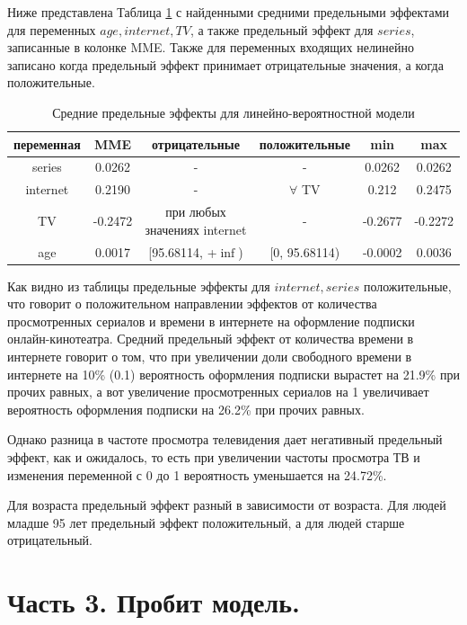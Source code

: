 \documentclass[a4paper,12pt]{article}
\begin{document}
	Ниже представлена Таблица \ref{MElinear} с найденными средними предельными эффектами для переменных  $age, internet, TV$, а также предельный эффект для $series$, записанные в колонке MME. Также для переменных входящих нелинейно записано когда предельный эффект принимает отрицательные значения, а когда положительные.
	
	\begin{table}[h]
		\caption{Средние предельные эффекты для линейно-вероятностной модели}
		\label{MElinear}
		\centering
		\begin{tabular}{|c|c|c|c|c|c|}
			\hline
			переменная &  MME  & отрицательные& положительные&min&max\\ 
			\hline
			series &0.0262 &-&-&0.0262&0.0262\\ 
			\hline
			internet  &0.2190 &-& $\forall$ TV&0.212&0.2475\\ 
			\hline
			TV &-0.2472&при любых значениях internet& - &-0.2677&-0.2272 \\ 			
			\hline
			age  &0.0017 &[95.68114, +$\inf$) &[0, 95.68114)&-0.0002 &0.0036\\ 
			\hline
		\end{tabular}
	\end{table}

	Как видно из таблицы предельные эффекты для $internet, series$ положительные, что говорит о положительном направлении эффектов от количества просмотренных сериалов и времени в интернете на оформление подписки онлайн-кинотеатра. Средний предельный эффект от количества времени в интернете говорит о том, что при увеличении доли свободного времени в интернете на 10\% (0.1) вероятность оформления подписки вырастет на 21.9\% при прочих равных, а вот увеличение просмотренных сериалов на 1 увеличивает вероятность оформления подписки на 26.2\% при прочих равных. 
	
	Однако разница в частоте просмотра телевидения дает негативный предельный эффект, как и ожидалось, то есть при увеличении частоты просмотра ТВ и изменения переменной с 0 до 1 вероятность уменьшается на 24.72\%. 
	
	Для возраста предельный эффект разный в зависимости от возраста. Для людей младше 95 лет предельный эффект положительный, а для людей старше отрицательный.


	\newpage
	
	\section{Часть 3. Пробит модель.}
\end{document}
